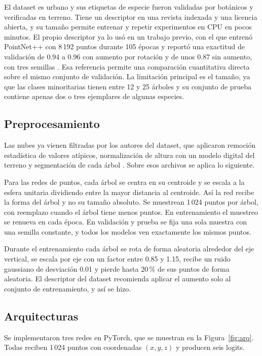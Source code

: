 \documentclass[preprint,12pt]{elsarticle}
\begin{document}
El dataset es urbano y sus etiquetas de especie fueron validadas por botánicos y verificadas en terreno. Tiene un descriptor en una revista indexada y una licencia abierta, y su tamaño permite entrenar y repetir experimentos en CPU en pocos minutos. El propio descriptor ya lo usó en un trabajo previo, con el que entrenó PointNet++ con 8\,192 puntos durante 105 épocas y reportó una exactitud de validación de 0.94 a 0.96 con aumento por rotación y de unos 0.87 sin aumento, con tres semillas \cite{hamdani2026urbantree3d}. Esa referencia permite una comparación cuantitativa directa sobre el mismo conjunto de validación. La limitación principal es el tamaño, ya que las clases minoritarias tienen entre 12 y 25 árboles y su conjunto de prueba contiene apenas dos o tres ejemplares de algunas especies.

\subsection{Preprocesamiento}

Las nubes ya vienen filtradas por los autores del dataset, que aplicaron remoción estadística de valores atípicos, normalización de altura con un modelo digital del terreno y segmentación de cada árbol \cite{hamdani2026urbantree3d}. Sobre esos archivos se aplica lo siguiente.

Para las redes de puntos, cada árbol se centra en su centroide y se escala a la esfera unitaria dividiendo entre la mayor distancia al centroide. Así la red recibe la forma del árbol y no su tamaño absoluto. Se muestrean 1\,024 puntos por árbol, con reemplazo cuando el árbol tiene menos puntos. En entrenamiento el muestreo se renueva en cada época. En validación y prueba se fija una sola muestra con una semilla constante, y todos los modelos ven exactamente los mismos puntos.

Durante el entrenamiento cada árbol se rota de forma aleatoria alrededor del eje vertical, se escala por eje con un factor entre 0.85 y 1.15, recibe un ruido gaussiano de desviación 0.01 y pierde hasta 20\,\% de sus puntos de forma aleatoria. El descriptor del dataset recomienda aplicar el aumento solo al conjunto de entrenamiento, y así se hizo.

\subsection{Arquitecturas}

Se implementaron tres redes en PyTorch, que se muestran en la Figura~\ref{fig:arq}. Todas reciben 1\,024 puntos con coordenadas $(x,y,z)$ y producen seis logits.
\end{document}
